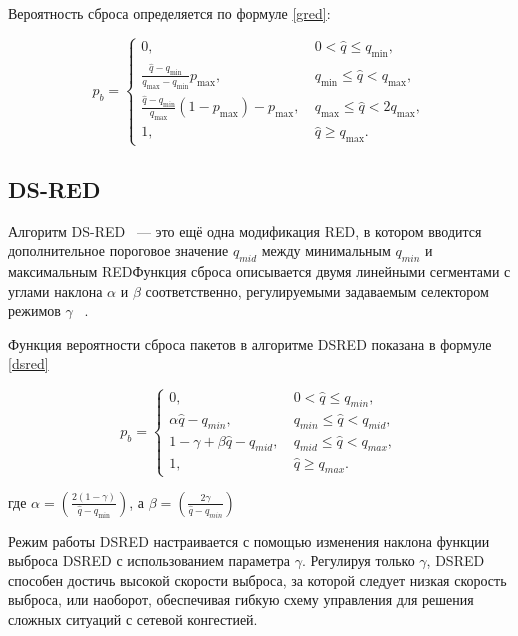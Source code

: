 Вероятность сброса определяется по формуле \eqref{gred}:

\begin{equation}
\label{gred}
p_{b} =\begin{cases}
        0, &  \  0 < \hat{q} \leqslant q_{\min}, 
        \\
        \frac{\hat{q} - q_{\min}}{q_{\max} - q_{\min}} p_{\max}, & \ q_{\min} \leqslant \hat{q} < q_{\max}, 
        \\
        \frac{\hat{q} - q_{\min}}{q_{\max}}(1-p_{\max}) - p_{\max}, & \ q_{\max} \leqslant \hat{q} < 2q_{\max}, 
        \\
        1, &  \ \hat{q} \geqslant  q_{\max}.
\end{cases}
\end{equation}


\subsection{DS-RED}

Алгоритм DS-RED ~--- это ещё одна модификация RED, в котором вводится дополнительное пороговое значение $q_{mid}$ между минимальным $q_{min}$ и максимальным
REDФункция сброса описывается двумя линейными сегментами с углами наклона $\alpha $ и $\beta $ соответственно, регулируемыми
задаваемым селектором режимов $\gamma$ ~\cite{DSRED}. 

Функция вероятности сброса пакетов в алгоритме DSRED показана в формуле \eqref{dsred}

\begin{equation}
\label{dsred}
p_{b} =\begin{cases}
        0, &  \  0 < \hat{q} \leqslant q_{min}, 
        \\
        \alpha{\hat{q} - q_{min}}, & \ q_{min} \leqslant \hat{q} < q_{mid}, 
        \\
        1 - \gamma + \beta{\hat{q} - q_{mid}}, & \ q_{mid} \leqslant \hat{q} < q_{max}, 
        \\
        1, &  \ \hat{q} \geqslant  q_{max}.
\end{cases}
\end{equation}

где $\alpha = (\frac{2(1 - \gamma)}{\hat{q} - q_{\min}})$, а $\beta = (\frac{2\gamma}{\hat{q} - q_{min}})$

Режим работы DSRED настраивается с помощью изменения наклона функции выброса DSRED с использованием параметра $\gamma$. 
Регулируя только $\gamma$, DSRED способен достичь высокой скорости выброса, за которой следует низкая скорость выброса, 
или наоборот, обеспечивая гибкую схему управления для решения сложных ситуаций с сетевой конгестией.

